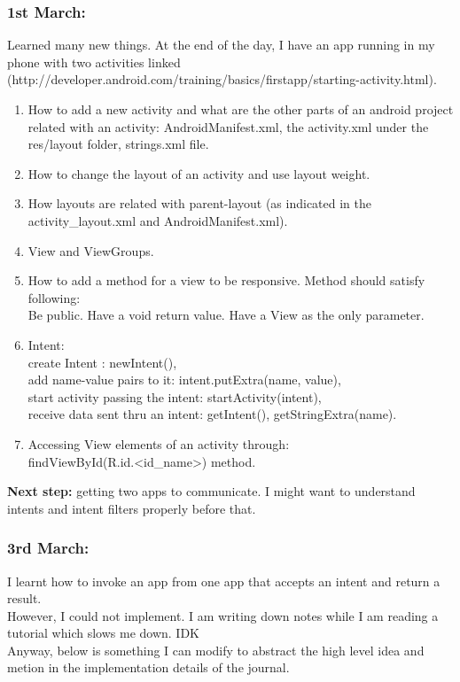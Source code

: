 \documentclass[11pt]{article}
\begin{document}
\subsubsection*{1st March:}
Learned many new things. At the end of the day, I have an app running in my phone with two activities linked 
(http://developer.android.com/training/basics/firstapp/starting-activity.html).
\begin{enumerate}
 \item How to add a new activity and what are the other parts of an android project related with an activity: AndroidManifest.xml, the activity.xml 
under the res/layout folder, strings.xml file.
 \item How to change the layout of an activity and use layout weight. 
 \item How layouts are related with parent-layout (as indicated in the activity\_layout.xml and AndroidManifest.xml).
 \item View and ViewGroups.
 \item How to add a method for a view to be responsive. Method should satisfy following:\\
 Be public. Have a void return value. Have a View as the only parameter.
 \item Intent: \\
 create Intent : newIntent(), \\
 add name-value pairs to it: intent.putExtra(name, value),\\
 start activity passing the intent: 
 startActivity(intent), \\
 receive data sent thru an intent: getIntent(), getStringExtra(name). 
 \item Accessing View elements of an activity through:\\
 findViewById(R.id.<id\_name>)  method.
\end{enumerate}

\textbf{Next step:} getting two apps to communicate. I might want to understand intents and intent filters properly before that.

\subsubsection*{3rd March:}
I learnt how to invoke an app from one app that accepts an intent and return a result.\\
However, I could not implement. I am writing down notes while I am reading a tutorial which slows me down. IDK\\
Anyway, below is something I can modify to abstract the high level idea and metion in the implementation details of the journal.\\
\end{document}
